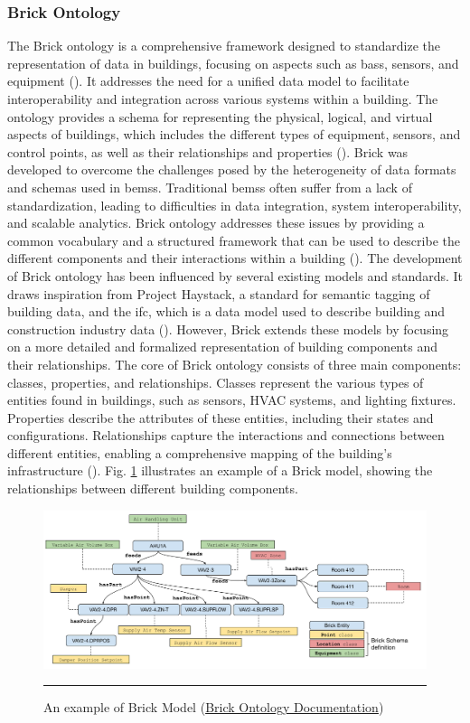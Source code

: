 \subsubsection*{Brick Ontology}
The Brick ontology is a comprehensive framework designed to standardize the representation of data in buildings, focusing on aspects such as \glspl{bas}, sensors, and equipment (\cite{Balaji2016}).
It addresses the need for a unified data model to facilitate interoperability and integration across various systems within a building.
The ontology provides a schema for representing the physical, logical, and virtual aspects of buildings, which includes the different types of equipment, sensors, and control points, as well as their relationships and properties (\cite{Balaji2018}).
Brick was developed to overcome the challenges posed by the heterogeneity of data formats and schemas used in \glspl{bems}. Traditional \glspl{bems} often suffer from a lack of standardization, leading to difficulties in data integration, system interoperability, and scalable analytics.
Brick ontology addresses these issues by providing a common vocabulary and a structured framework that can be used to describe the different components and their interactions within a building (\cite{Balaji2018}).
The development of Brick ontology has been influenced by several existing models and standards.
It draws inspiration from Project Haystack, a standard for semantic tagging of building data, and the \gls{ifc}, which is a data model used to describe building and construction industry data (\cite{Balaji2016}).
However, Brick extends these models by focusing on a more detailed and formalized representation of building components and their relationships.
The core of Brick ontology consists of three main components: classes, properties, and relationships.
Classes represent the various types of entities found in buildings, such as sensors, HVAC systems, and lighting fixtures.
Properties describe the attributes of these entities, including their states and configurations.
Relationships capture the interactions and connections between different entities, enabling a comprehensive mapping of the building's infrastructure (\cite{Balaji2018}).
Fig. \ref{fig:brick-model-example} illustrates an example of a Brick model, showing the relationships between different building components.
\begin{figure}[htbp]
    \centering
 \includegraphics[width=.9\textwidth]{03_Figures/literature-review/brick-model-example.png}
     \rule{35em}{0.5pt}
    \caption{An example of Brick Model (\href{https://docs.brickschema.org/brick/concepts.html}{Brick Ontology Documentation})} 
 \label{fig:brick-model-example}
\end{figure}

